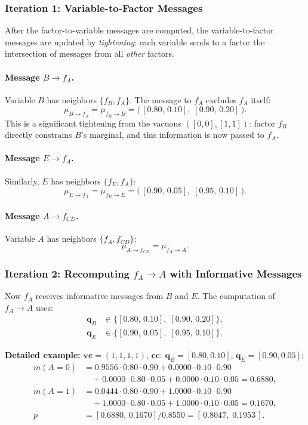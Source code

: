 \documentclass{article}
\begin{document}
\subsubsection{Iteration 1: Variable-to-Factor Messages}

After the factor-to-variable messages are computed, the variable-to-factor
messages are updated by \emph{tightening}: each variable sends to a factor
the intersection of messages from all \emph{other} factors.

\paragraph{Message $B \to f_A$.}
Variable $B$ has neighbors $\{f_B, f_A\}$. The message to $f_A$ excludes $f_A$ itself:
\[
  \mu_{B \to f_A} = \mu_{f_B \to B} = \bigl(\,[0.80,\, 0.10],\; [0.90,\, 0.20]\,\bigr).
\]
This is a significant tightening from the vacuous $([0,0],[1,1])$: factor $f_B$
directly constrains $B$'s marginal, and this information is now passed to $f_A$.

\paragraph{Message $E \to f_A$.}
Similarly, $E$ has neighbors $\{f_E, f_A\}$:
\[
  \mu_{E \to f_A} = \mu_{f_E \to E} = \bigl(\,[0.90,\, 0.05],\; [0.95,\, 0.10]\,\bigr).
\]

\paragraph{Message $A \to f_{CD}$.}
Variable $A$ has neighbors $\{f_A, f_{CD}\}$:
\[
  \mu_{A \to f_{CD}} = \mu_{f_A \to A}.
\]

\subsubsection{Iteration 2: Recomputing $f_A \to A$ with Informative Messages}

Now $f_A$ receives informative messages from $B$ and $E$. The computation of
$f_A \to A$ uses:
\begin{align*}
  \mathbf{q}_B &\in \{[0.80,\, 0.10],\; [0.90,\, 0.20]\}, \\
  \mathbf{q}_E &\in \{[0.90,\, 0.05],\; [0.95,\, 0.10]\}.
\end{align*}

\textbf{Detailed example:} $\mathbf{vc} = (1,1,1,1)$, $\mathbf{cc}$: $\mathbf{q}_B = [0.80, 0.10]$,
$\mathbf{q}_E = [0.90, 0.05]$:
\begin{align*}
  m(A{=}0) &= 0.9556 \cdot 0.80 \cdot 0.90 + 0.0000 \cdot 0.10 \cdot 0.90 \\
            &\quad + 0.0000 \cdot 0.80 \cdot 0.05 + 0.0000 \cdot 0.10 \cdot 0.05 = 0.6880, \\
  m(A{=}1) &= 0.0444 \cdot 0.80 \cdot 0.90 + 1.0000 \cdot 0.10 \cdot 0.90 \\
            &\quad + 1.0000 \cdot 0.80 \cdot 0.05 + 1.0000 \cdot 0.10 \cdot 0.05 = 0.1670, \\
  p &= [0.6880,\, 0.1670] / 0.8550 = [\,0.8047,\; 0.1953\,].
\end{align*}
\end{document}
